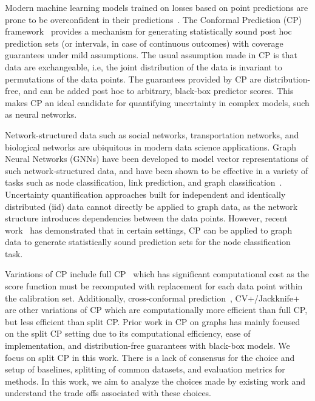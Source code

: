 Modern machine learning models trained on losses based on point predictions are prone to be overconfident in their predictions~\citep{guo2017calibration}. 
The Conformal Prediction (CP) framework~\citep{vovk2005algorithmic} provides a mechanism for generating statistically sound post hoc prediction sets (or intervals, in case of continuous outcomes) with coverage guarantees under mild assumptions.
The usual assumption made in CP is that data are exchangeable, i.e, the joint distribution of the data is invariant to permutations of the data points.
The guarantees provided by CP are distribution-free, and can be added post hoc to arbitrary, black-box predictor scores.
This makes CP an ideal candidate for quantifying uncertainty in complex models, such as neural networks.

Network-structured data such as social networks, transportation networks, and biological networks are ubiquitous in modern data science applications.
Graph Neural Networks (GNNs) have been developed to model vector representations of such network-structured data, and have been shown to be effective in a variety of tasks such as node classification, link prediction, and graph classification~\citep{hamilton2020graph, wu2022graph}.
Uncertainty quantification approaches built for independent and identically distributed (iid) data cannot directly be applied to graph data, as the network structure introduces dependencies between the data points.
However, recent work~\citep{clarkson2023distribution,zargarbashi23conformal,huang2024uncertainty} has demonstrated that in certain settings, CP can be applied to graph data to generate statistically sound prediction sets for the node classification task.

Variations of CP include full CP~\citep{vovk2005algorithmic} which has significant computational cost as the score function must be recomputed with replacement for each data point within the calibration set.
Additionally, cross-conformal prediction~\citep{vovk2015cross}, CV+/Jackknife+~\citep{barber2021predictive} are other variations of CP which are computationally more efficient than full CP, but less efficient than split CP.
Prior work in CP on graphs has mainly focused on the split CP setting due to its computational efficiency, ease of implementation, and distribution-free guarantees with black-box models. 
We focus on split CP in this work.
There is a lack of consensus for the choice and setup of baselines, splitting of common datasets, and evaluation metrics for methods.
In this work, we aim to analyze the choices made by existing work and understand the trade offs associated with these choices.
